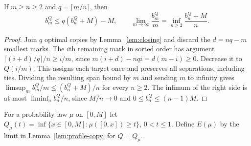 \begin{lemma}\label{lem:profile-copy}
If $m\ge n\ge2$ and $q=\lceil m/n\rceil$, then
\[
 b_m^Q\le q(b_n^Q+M)-M,\qquad
 \lim_{m\to\infty}\frac{b_m^Q}{m}=\inf_{n\ge2}\frac{b_n^Q+M}{n}.
\]
\end{lemma}
\begin{proof}
Join $q$ optimal copies by Lemma~\ref{lem:closing} and discard the
$d=nq-m$ smallest marks. The $i$th remaining mark in sorted order has
argument $\lceil(i+d)/q\rceil/n\ge i/m$, since
$m(i+d)-nqi=d(m-i)\ge0$. Decrease it to $Q(i/m)$. This assigns each
target once and preserves all separations, including ties. Dividing
the resulting span bound by $m$ and sending $m$ to infinity gives
$\limsup_m b_m^Q/m\le(b_n^Q+M)/n$ for every $n\ge2$. The infimum of
the right side is at most $\liminf_n b_n^Q/n$, since $M/n\to0$ and
$0\le b_n^Q\le(n-1)M$.
\end{proof}

For a probability law $\mu$ on $[0,M]$ let
$Q_\mu(t)=\inf\{x\in[0,M]:\mu([0,x])\ge t\}$, $0<t\le1$.
Define $E(\mu)$ by the limit in Lemma~\ref{lem:profile-copy} for
$Q=Q_\mu$.

